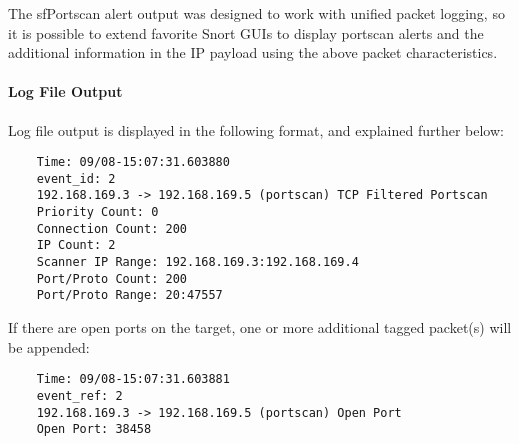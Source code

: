 \documentclass[english]{report}
\begin{document}
The sfPortscan alert output was designed to work with unified packet logging,
so it is possible to extend favorite Snort GUIs to display portscan alerts and
the additional information in the IP payload using the above packet
characteristics.

\paragraph{Log File Output}

Log file output is displayed in the following format, and explained further
below:

\begin{verbatim}
    Time: 09/08-15:07:31.603880
    event_id: 2
    192.168.169.3 -> 192.168.169.5 (portscan) TCP Filtered Portscan
    Priority Count: 0
    Connection Count: 200
    IP Count: 2
    Scanner IP Range: 192.168.169.3:192.168.169.4
    Port/Proto Count: 200
    Port/Proto Range: 20:47557
\end{verbatim}

If there are open ports on the target, one or more additional tagged packet(s)
will be appended:

\begin{verbatim}
    Time: 09/08-15:07:31.603881
    event_ref: 2
    192.168.169.3 -> 192.168.169.5 (portscan) Open Port
    Open Port: 38458
\end{verbatim}
\end{document}
